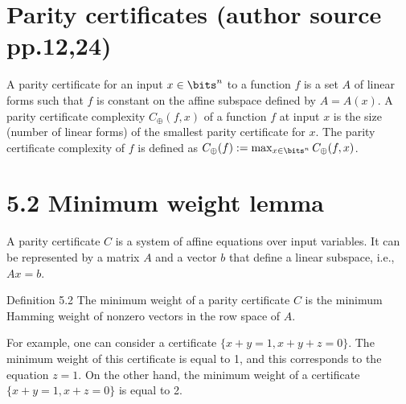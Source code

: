 \section*{Parity certificates (author source pp.12,24)}
A parity certificate for an input $x\in\bits^n$ to a function $f$ is a set $A$ of linear forms such that $f$ is constant on the affine subspace defined by $A=A(x)$. A parity certificate complexity $C_\oplus(f,x)$ of a function $f$ at input $x$ is the size (number of linear forms) of the smallest parity certificate for $x$. The parity certificate complexity of $f$ is defined as $C_\oplus(f):=\max_{x\in\bits^n}C_\oplus(f,x)$.
\section*{5.2 Minimum weight lemma}
A parity certificate $C$ is a system of affine equations over input variables. It can be represented by a matrix $A$ and a vector $b$ that define a linear subspace, i.e., $Ax=b$.
\begin{originalresult}{Definition 5.2}
The minimum weight of a parity certificate $C$ is the minimum Hamming weight of nonzero vectors in the row space of $A$.
\end{originalresult}
For example, one can consider a certificate $\{x+y=1,x+y+z=0\}$. The minimum weight of this certificate is equal to 1, and this corresponds to the equation $z=1$. On the other hand, the minimum weight of a certificate $\{x+y=1,x+z=0\}$ is equal to 2.
